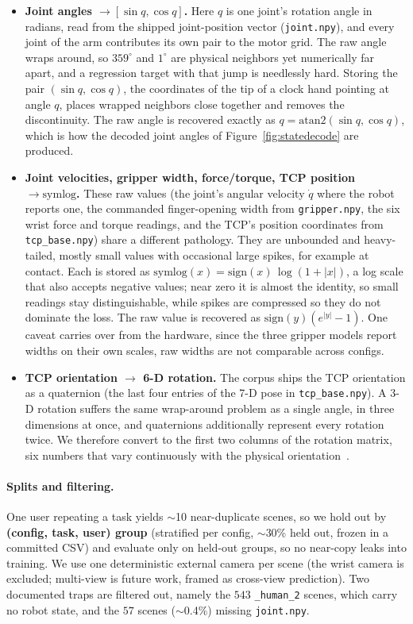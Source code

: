 \documentclass{article}
\begin{document}
\begin{itemize}
  \item \textbf{Joint angles $\rightarrow [\sin q, \cos q]$.} Here $q$ is one joint's rotation angle in radians, read from the shipped joint-position vector (\texttt{joint.npy}), and every joint of the arm contributes its own pair to the motor grid. The raw angle wraps around, so $359^\circ$ and $1^\circ$ are physical neighbors yet numerically far apart, and a regression target with that jump is needlessly hard. Storing the pair $(\sin q, \cos q)$, the coordinates of the tip of a clock hand pointing at angle $q$, places wrapped neighbors close together and removes the discontinuity. The raw angle is recovered exactly as $q = \mathrm{atan2}(\sin q, \cos q)$, which is how the decoded joint angles of Figure~\ref{fig:statedecode} are produced.
  \item \textbf{Joint velocities, gripper width, force/torque, TCP position $\rightarrow \mathrm{symlog}$.} These raw values (the joint's angular velocity $\dot q$ where the robot reports one, the commanded finger-opening width from \texttt{gripper.npy}, the six wrist force and torque readings, and the TCP's position coordinates from \texttt{tcp\_base.npy}) share a different pathology. They are unbounded and heavy-tailed, mostly small values with occasional large spikes, for example at contact. Each is stored as $\mathrm{symlog}(x) = \mathrm{sign}(x)\,\log(1+|x|)$, a log scale that also accepts negative values; near zero it is almost the identity, so small readings stay distinguishable, while spikes are compressed so they do not dominate the loss. The raw value is recovered as $\mathrm{sign}(y)(e^{|y|}-1)$. One caveat carries over from the hardware, since the three gripper models report widths on their own scales, raw widths are not comparable across configs.
  \item \textbf{TCP orientation $\rightarrow$ 6-D rotation.} The corpus ships the TCP orientation as a quaternion (the last four entries of the 7-D pose in \texttt{tcp\_base.npy}). A 3-D rotation suffers the same wrap-around problem as a single angle, in three dimensions at once, and quaternions additionally represent every rotation twice. We therefore convert to the first two columns of the rotation matrix, six numbers that vary continuously with the physical orientation~\citep{rot6d2019}.
\end{itemize}

\paragraph{Splits and filtering.}
One user repeating a task yields $\sim$10 near-duplicate scenes, so we hold out by \textbf{(config, task, user) group} (stratified per config, $\sim$30\% held out, frozen in a committed CSV) and evaluate only on held-out groups, so no near-copy leaks into training. We use one deterministic external camera per scene (the wrist camera is excluded; multi-view is future work, framed as cross-view prediction). Two documented traps are filtered out, namely the $543$ \texttt{\_human\_2} scenes, which carry no robot state, and the $57$ scenes ($\sim$0.4\%) missing \texttt{joint.npy}.
\end{document}
